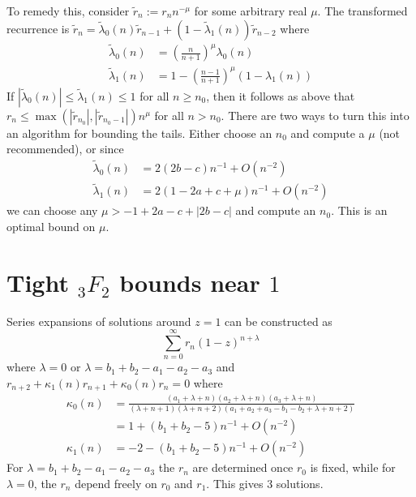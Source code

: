 \documentclass[12pt]{article}
\numberwithin{equation}{section}
\begin{document}
To remedy this, consider $\tilde{r}_n := r_n n^{-\mu}$ for some arbitrary real $\mu$. The transformed recurrence is $\tilde{r}_n = \tilde{\lambda}_0(n) \tilde{r}_{n-1} + (1 - \tilde{\lambda}_1(n)) \tilde{r}_{n-2}$ where
\begin{align*}
\tilde{\lambda}_0(n) &= \left(\frac{n}{n+1}\right)^{\mu} \lambda_0(n)\\
\tilde{\lambda}_1(n) &= 1 - \left(\frac{n-1}{n+1}\right)^{\mu} (1-\lambda_1(n))
\end{align*}
If $|\tilde{\lambda}_0(n)| \le \tilde{\lambda}_1(n) \le 1$ for all $n \ge n_0$, then it follows as above that $r_n \le \max(|\tilde{r}_{n_0}|, |\tilde{r}_{n_0-1}|) n^{\mu}$ for all $n > n_0$. There are two ways to turn this into an algorithm for bounding the tails. Either choose an $n_0$ and compute a $\mu$ (not recommended), or since
\begin{align*}
\tilde{\lambda}_0(n) &= 2 (2 b-c) n^{-1}+O\left(n^{-2}\right)\\
\tilde{\lambda}_1(n) &= 2 (1-2 a+c+\mu) n^{-1} + O\left(n^{-2}\right)
\end{align*}
we can choose any $\mu >-1 + 2 a - c + |2 b-c|$ and compute an $n_0$. This is an optimal bound on $\mu$.



\section{Tight ${}_3 F_2$ bounds near $1$}

Series expansions of solutions around $z=1$ can be constructed as
\begin{equation*}
\sum_{n=0}^{\infty} r_n (1-z)^{n+\lambda}
\end{equation*}
where $\lambda =0$ or $\lambda = b_1+b_2-a_1-a_2-a_3$ and $r_{n+2} + \kappa_1(n) r_{n+1} + \kappa_0(n) r_n = 0$ where
\begin{align*}
\kappa_0(n) &= \frac{\left(a_1+\lambda +n\right) \left(a_2+\lambda
   +n\right) \left(a_3+\lambda +n\right)}{(\lambda +n+1)
   (\lambda +n+2) \left(a_1+a_2+a_3-b_1-b_2+\lambda
   +n+2\right)}\\
&=1 + \left(b_1+b_2-5 \right) n^{-1} + O(n^{-2})\\
\kappa_1(n) &=-2 - \left(b_1+b_2-5 \right) n^{-1} + O(n^{-2})
\end{align*}
For $\lambda = b_1+b_2-a_1-a_2-a_3$ the $r_n$ are determined once $r_0$ is fixed, while for $\lambda = 0$, the $r_n$ depend freely on $r_0$ and $r_1$. This gives $3$ solutions.
\end{document}
